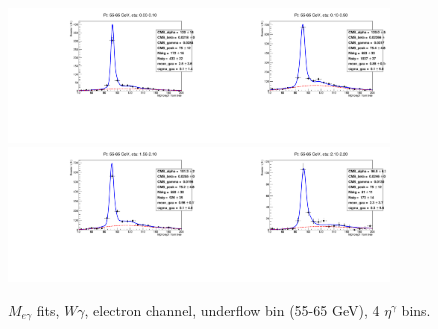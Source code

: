 \begin{figure}[htb]
  \begin{center}
   \includegraphics[width=0.45\textwidth]{../figs/figs_v11/ELECTRON_WGamma/EtoGammaFits/sa_hZmass_h_Data_EtoGamma_Enr_BARREL_pt55to65_ieta0_noWMtCut.pdf}\includegraphics[width=0.45\textwidth]{../figs/figs_v11/ELECTRON_WGamma/EtoGammaFits/sa_hZmass_h_Data_EtoGamma_Enr_BARREL_pt55to65_ieta1_noWMtCut.pdf}\\
   \includegraphics[width=0.45\textwidth]{../figs/figs_v11/ELECTRON_WGamma/EtoGammaFits/sa_hZmass_h_Data_EtoGamma_Enr_ENDCAP_pt55to65_ieta0_noWMtCut.pdf}\includegraphics[width=0.45\textwidth]{../figs/figs_v11/ELECTRON_WGamma/EtoGammaFits/sa_hZmass_h_Data_EtoGamma_Enr_ENDCAP_pt55to65_ieta1_noWMtCut.pdf}\\
  \label{fig:etogFits_55to65}
  \caption{$M_{e\gamma}$ fits, $W\gamma$, electron channel, underflow bin (55-65 GeV), 4 $\eta^{\gamma}$ bins.}
  \end{center}
\end{figure}

